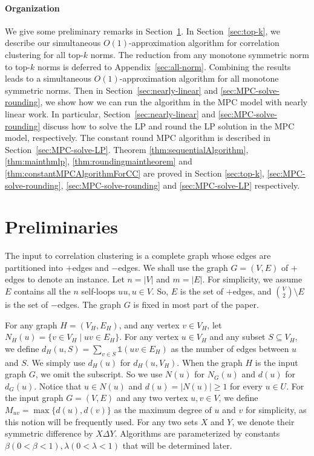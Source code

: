 \documentclass[11pt]{article}
\begin{document}
\begin{CJK*}{UTF8}{gbsn}
 
\paragraph{Organization} We give some 
preliminary remarks in Section~\ref{sec:prelim}. In Section~\ref{sec:top-k}, we describe our simultaneous $O(1)$-approximation algorithm for correlation clustering for all top-$k$ norms. The reduction from any monotone symmetric norm to top-$k$ norms is deferred to Appendix~\ref{sec:all-norm}. Combining the results leads to a simultaneous $O(1)$-approximation algorithm for all monotone symmetric norms. Then in Section~\ref{sec:nearly-linear} and \ref{sec:MPC-solve-rounding}, we show how we can run the algorithm in the MPC model with nearly linear work. In particular, Section~\ref{sec:nearly-linear} and \ref{sec:MPC-solve-rounding} discuss how to solve the LP and round the LP solution in the MPC model, respectively.  The constant round MPC algorithm is described in Section~\ref{sec:MPC-solve-LP}. Theorem \ref{thm:sequentialAlgorithm}, \ref{thm:mainthmlp}, \ref{thm:roundingmaintheorem} and \ref{thm:constantMPCAlgorithmForCC} are proved in Section \ref{sec:top-k}, \ref{sec:MPC-solve-rounding}, \ref{sec:MPC-solve-rounding} and \ref{sec:MPC-solve-LP} respectively.


 

\section{Preliminaries}
\label{sec:prelim}
The input to correlation clustering is a complete graph whose edges are partitioned into $+$edges and $-$edges. We shall use the graph $G = (V, E)$ of $+$edges to denote an instance. Let $n = |V|$ and $m = |E|$. For simplicity, we assume $E$ contains all the $n$ self-loops $uu, u \in V$.
So, $E$ is the set of $+$edges, and ${V \choose 2} \setminus E$ is the set of $-$edges.  The graph $G$ is fixed in most part of the paper. 


For any graph $H = (V_H, E_H)$, and any vertex $v \in V_H$, let $N_H(u) = \{v \in V_H \mid uv \in E_H\}$. For any vertex $u \in V_H$ and any subset $S \subseteq V_H$, we define $d_H(u, S) = \sum_{v \in S} \mathbb{1}(uv \in E_H)$ as the number of edges between $u$ and $S$. We simply use $d_H(u)$ for $d_H(u, V_H)$. When the graph $H$ is the input graph $G$, we omit the subscript. So we use $N(u)$ for $N_G(u)$ and $d(u)$ for $d_G(u)$. Notice that $u \in N(u)$ and $d(u) = |N(u)| \geq 1$ for every $u \in U$.  For the input graph $G = (V, E)$ and any two vertex $u, v \in V$, we define $M_{uv} = \max\{d(u), d(v)\}$ as the maximum degree of $u$ and $v$ for simplicity, as this notion will be frequently used. For any two sets $X$ and $Y$, we denote their symmetric difference by $X \Delta Y$. Algorithms are parameterized by constants $ \beta(0<\beta<1), \lambda(0<\lambda<1)$ that will be determined later. \medskip



\end{CJK*}
\end{document}
